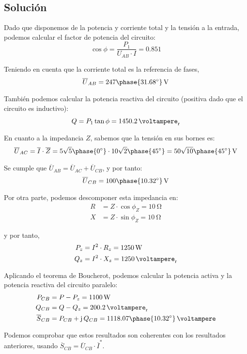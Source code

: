 \subsection*{Solución}

Dado que disponemos de la potencia y corriente total y la tensión a
la entrada, podemos calcular el factor de potencia del circuito:
\[
\cos \phi = \frac{P_1}{U_{AB} \cdot I} = 0.851
\]

Teniendo en cuenta que la corriente total es la referencia de fases, 
\[
\overline{U}_{AB} = {247 \phase{\ang{31.68}}}\,\si{\volt}
\]

También podemos calcular la potencia reactiva del circuito
(positiva dado que el circuito es inductivo):
\[
Q = P_1 \tan \phi = \qty{1450.2}{\voltampere_r}
\]


En cuanto a la impedancia $Z$, sabemos que la tensión en sus bornes
es:
\[
\overline{U}_{AC} = \overline{I} \cdot \overline{Z} =
5\sqrt{5}\phase{\ang{0}} \cdot 10\sqrt{2}\phase{\ang{45}} = {50\sqrt{10}\phase{\ang{45}}}\,\si{\volt}
\]

Se cumple que $\overline{U}_{AB} = \overline{U}_{AC} +
\overline{U}_{CB}$, y por tanto:
\[
\overline{U}_{CB} = {100\phase{\ang{10.32}}}\,\si{\volt}
\]

Por otra parte, podemos descomponer esta impedancia en:
\begin{align*}
  R &= Z \cdot \cos \phi_Z = \qty{10}{\ohm}\\
  X &= Z \cdot \sin \phi_Z = \qty{10}{\ohm}
\end{align*}

y por tanto,
\begin{align*}
P_z &= I^2 \cdot R_z = \qty{1250}{\watt}\\
Q_z &= I^2 \cdot X_z = \qty{1250}{\voltampere_r}
\end{align*}

Aplicando el teorema de Boucherot, podemos calcular la potencia activa
y la potencia reactiva del circuito paralelo:
\begin{align*}
P_{CB} &= P - P_z = \qty{1100}{\watt}\\
Q_{CB} &= Q - Q_z = \qty{200.2}{\voltampere_r}\\
\overline{S}_{CB} &= P_{CB} + \mathrm{j}\, Q_{CB} = {1118.07\phase{\ang{10.32}}}\,\si{\voltampere}
\end{align*}

Podemos comprobar que estos resultados son coherentes con los
resultados anteriores, usando $\overline{S}_{CB} = \overline{U}_{CB}
\cdot \overline{I}^*$.


